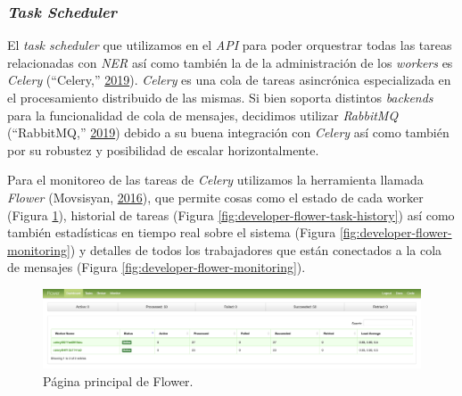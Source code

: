 \documentclass[12pt,a4paper,]{scrartcl}
\begin{document}
\hypertarget{task-scheduler-1}{%
\subsubsection{\texorpdfstring{\emph{Task Scheduler}}{Task Scheduler}}\label{task-scheduler-1}}

El \emph{task scheduler} que utilizamos en el \emph{API} para poder orquestrar todas las tareas relacionadas con \emph{NER} así como también la de la administración de los \emph{workers} es \emph{Celery} (``Celery,'' \protect\hyperlink{ref-celery}{2019}). \emph{Celery} es una cola de tareas asincrónica especializada en el procesamiento distribuido de las mismas. Si bien soporta distintos \emph{backends} para la funcionalidad de cola de mensajes, decidimos utilizar \emph{RabbitMQ} (``RabbitMQ,'' \protect\hyperlink{ref-rabbitmq}{2019}) debido a su buena integración con \emph{Celery} así como también por su robustez y posibilidad de escalar horizontalmente.

Para el monitoreo de las tareas de \emph{Celery} utilizamos la herramienta llamada \emph{Flower} (Movsisyan, \protect\hyperlink{ref-flower}{2016}), que permite cosas como el estado de cada worker (Figura \ref{fig:developer-flower-dashboard}), historial de tareas (Figura \ref{fig:developer-flower-task-history}) así como también estadísticas en tiempo real sobre el sistema (Figura \ref{fig:developer-flower-monitoring}) y detalles de todos los trabajadores que están conectados a la cola de mensajes (Figura \ref{fig:developer-flower-monitoring}).

\begin{figure}[H]

{\centering \includegraphics{assets/developer/flower-dashboard.png} 

}

\caption{Página principal de Flower.}\label{fig:developer-flower-dashboard}
\end{figure}
\end{document}
